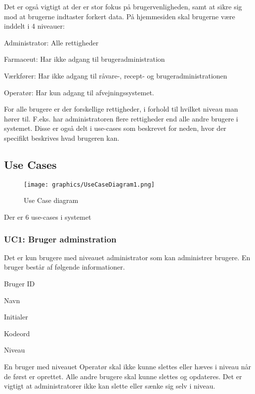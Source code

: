 \documentclass[a4paper]{article}
\newenvironment{my_itemize}
{\begin{itemize}
  \setlength{\itemsep}{1pt}
  \setlength{\parskip}{0pt}
  \setlength{\parsep}{0pt}}
{\end{itemize}}
\begin{document}
Det er også vigtigt at der er stor fokus på brugervenligheden, samt at sikre sig mod at brugerne indtaster forkert data. På hjemmesiden skal brugerne være inddelt i 4 niveauer:

\begin{my_itemize}
  \item Administrator: Alle rettigheder
  \item Farmaceut: Har ikke adgang til brugeradministration
  \item Værkfører: Har ikke adgang til råvare-, recept- og brugeradministrationen 
  \item Operatør: Har kun adgang til afvejningssystemet. 
\end{my_itemize}

For alle brugere er der forskellige rettigheder, i forhold til hvilket niveau man hører til. F.eks. har administratoren flere rettigheder end alle andre brugere i systemet. Disse er også delt i use-cases som beskrevet for neden, hvor der specifikt beskrives hvad brugeren kan. 


\subsection{Use Cases} %

\begin{figure}[H]
  \centering
  \texttt{[image: graphics/UseCaseDiagram1.png]}
  \caption{Use Case diagram}
\end{figure}


Der er 6 use-cases i systemet

\subsubsection*{UC1: Bruger adminstration} %

Det er kun brugere med niveauet administrator som kan administrer brugere. En bruger består af følgende informationer.

\begin{my_itemize}
  \item Bruger ID
  \item Navn
  \item Initialer
  \item Kodeord
  \item Niveau
\end{my_itemize}

En bruger med niveauet Operatør skal ikke kunne slettes eller hæves i niveau når de først er oprettet.  Alle andre brugere skal kunne slettes og opdateres. Det er vigtigt at administratorer ikke kan slette eller sænke sig selv i niveau.   
\end{document}
